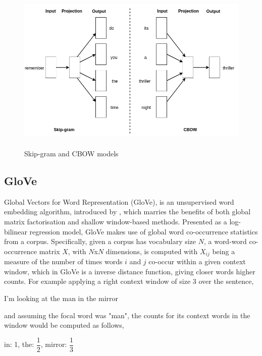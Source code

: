 \noindent
\newline
\begin{figure}[h]
	\includegraphics[width=12cm, height=8cm]{./figures/fig13}
	\centering
	\caption{Skip-gram and CBOW models}
	\label{fig:fig13}
\end{figure}
\subsection{GloVe}
Global Vectors for Word Representation (GloVe), is an unsupervised word embedding algorithm, introduced by \cite{Pennington2014}, which marries the benefits of both global matrix factorisation and shallow window-based methods. Presented as a log-bilinear regression model, GloVe makes use of global word co-occurrence statistics from a corpus. Specifically, given a  corpus has vocabulary size \(N\), a word-word co-occurrence matrix \(X\), with \(N\)x\(N\) dimensions, is computed with \(X_{ij}\) being a measure of the number of times words \(i\) and \(j\) co-occur within a given context window, which in GloVe is a inverse distance function, giving closer words higher counts. For example applying a right context window of size 3 over the sentence,

\begin{center}
	I'm looking at the man in the mirror
\end{center}

\noindent
and assuming the focal word was "man", the counts for its context words in the window would be computed as follows,

\begin{center}
	in: 1, \space
	the: \(\dfrac{1}{2}\), \space
	mirror: \(\dfrac{1}{3} \)
\end{center}


